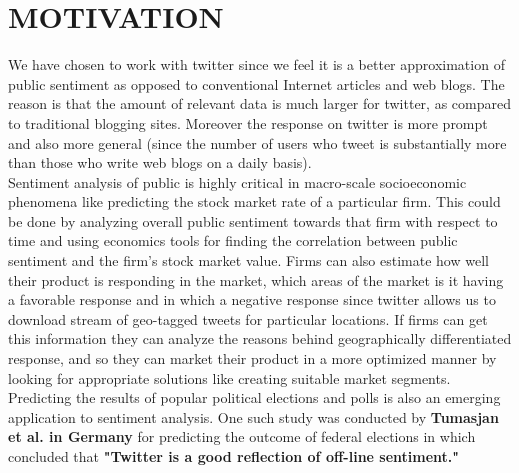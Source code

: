 \documentclass[preprint,12pt]{elsarticle}
\begin{document}
\section{MOTIVATION}
\label{S:1}
We have chosen to work with twitter since we feel it is a better approximation of public sentiment as opposed to conventional Internet articles and web blogs. The reason is that the amount of relevant data is much larger for twitter, as compared to traditional blogging sites. Moreover the response on twitter is more prompt and also more general (since the number of users who tweet is substantially more than those who write web blogs on a daily basis).\\
Sentiment analysis of public is highly critical in macro-scale socioeconomic phenomena like predicting the stock market rate of a particular firm. This could be done by analyzing overall public sentiment towards that firm with respect to time and using economics tools for finding the correlation between public sentiment and the firm’s stock market value. Firms can also estimate how well their product is responding in the market, which areas of the market is it having a favorable response and in which a negative response since twitter allows us to download stream of geo-tagged tweets for particular locations. If firms can get this information they can analyze the reasons behind geographically differentiated response, and so they can market their product in a more optimized manner by looking for appropriate solutions like creating suitable market segments.\\
Predicting the results of popular political elections and polls is also an emerging application to sentiment analysis. One such study was conducted by \textbf{Tumasjan et al. in Germany} for predicting
the outcome of federal elections in which concluded that \textbf{"Twitter is a good reflection of off-line sentiment."} \\
\end{document}
